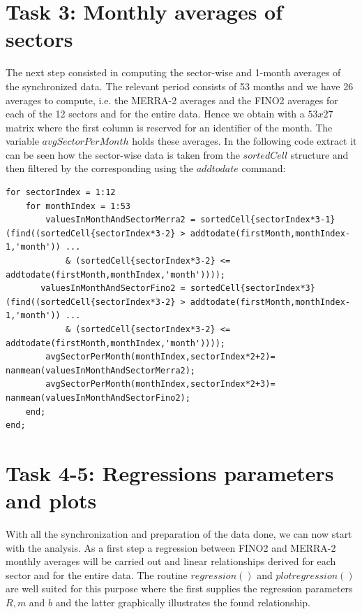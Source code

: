 \documentclass[10pt]{article}
\begin{document}
\section{Task 3: Monthly averages of sectors}
The next step consisted in computing the sector-wise and 1-month averages of the synchronized data. The relevant period consists of 53 months and we have 26 averages to compute, i.e. the MERRA-2 averages and the FINO2 averages for each of the 12 sectors and for the entire data. Hence we obtain with a $53 x 27$ matrix where the first column is reserved for an identifier of the month. The variable $avgSectorPerMonth$ holds these averages. In the following code extract it can be seen how the sector-wise data is taken from the $sortedCell$ structure and then filtered by the corresponding using the $addtodate$ command:
\begin{lstlisting}
for sectorIndex = 1:12
    for monthIndex = 1:53
        valuesInMonthAndSectorMerra2 = sortedCell{sectorIndex*3-1}(find((sortedCell{sectorIndex*3-2} > addtodate(firstMonth,monthIndex-1,'month')) ...
            & (sortedCell{sectorIndex*3-2} <= addtodate(firstMonth,monthIndex,'month'))));
       valuesInMonthAndSectorFino2 = sortedCell{sectorIndex*3}(find((sortedCell{sectorIndex*3-2} > addtodate(firstMonth,monthIndex-1,'month')) ...
            & (sortedCell{sectorIndex*3-2} <= addtodate(firstMonth,monthIndex,'month'))));
        avgSectorPerMonth(monthIndex,sectorIndex*2+2)= nanmean(valuesInMonthAndSectorMerra2);
        avgSectorPerMonth(monthIndex,sectorIndex*2+3)= nanmean(valuesInMonthAndSectorFino2);
    end;
end;
\end{lstlisting} 

\section{Task 4-5: Regressions parameters and plots} 
With all the synchronization and preparation of the data done, we can now start with the analysis. As a first step a regression between FINO2 and MERRA-2 monthly averages will be carried out and linear relationships derived for each sector and for the entire data. The routine $regression()$ and $plotregression()$ are well suited for this purpose where the first supplies the regression parameters $R, m$ and $b$ and the latter graphically illustrates the found relationship. 
\end{document}
